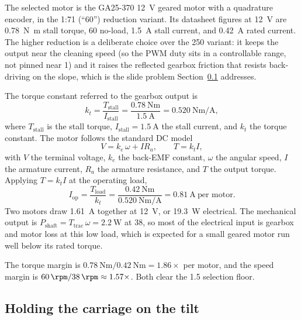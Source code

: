 \documentclass[11pt,a4paper]{article}
\begin{document}
The selected motor is the GA25-370 \SI{12}{\volt} geared motor with a quadrature
encoder, in the \num{1}:\num{71} (``\SI{60}{\rpm}'') reduction variant. Its
datasheet figures at \SI{12}{\volt} are \SI{0.78}{\newton\meter} stall torque,
\SI{60}{\rpm} no-load, \SI{1.5}{\ampere} stall current, and \SI{0.42}{\ampere}
rated current. The higher reduction is a deliberate choice over the
\SI{250}{\rpm} variant: it keeps the output near the cleaning speed (so the PWM
duty sits in a controllable range, not pinned near \num{1}) and it raises the
reflected gearbox friction that resists back-driving on the slope, which is the
slide problem Section~\ref{sec:hold} addresses.

The torque constant referred to the gearbox output is
\begin{equation}
  k_t = \frac{T_{\text{stall}}}{I_{\text{stall}}}
  = \frac{\SI{0.78}{\newton\meter}}{\SI{1.5}{\ampere}}
  = \SI{0.520}{\newton\meter\per\ampere},
  \label{eq:kt}
\end{equation}
where $T_{\text{stall}}$ is the stall torque, $I_{\text{stall}}=\SI{1.5}{\ampere}$
the stall current, and $k_t$ the torque constant. The motor follows the standard
DC model
\begin{equation}
  V = k_e\,\omega + I R_a, \qquad T = k_t I,
  \label{eq:dcmodel}
\end{equation}
with $V$ the terminal voltage, $k_e$ the back-EMF constant, $\omega$ the angular
speed, $I$ the armature current, $R_a$ the armature resistance, and $T$ the
output torque. Applying $T = k_t I$ at the operating load,
\begin{equation}
  I_{\text{op}} = \frac{T_{\text{load}}}{k_t}
  = \frac{\SI{0.42}{\newton\meter}}{\SI{0.520}{\newton\meter\per\ampere}}
  = \SI{0.81}{\ampere}\ \text{per motor.}
  \label{eq:iop_drive}
\end{equation}
Two motors draw \SI{1.61}{\ampere} together at \SI{12}{\volt}, or
\SI{19.3}{\watt} electrical. The mechanical output is
$P_{\text{shaft}} = T_{\text{trac}}\,\omega = \SI{2.2}{\watt}$ at
\SI{38}{\rpm}, so most of the electrical input is gearbox and motor loss at this
low load, which is expected for a small geared motor run well below its rated
torque.

The torque margin is $\SI{0.78}{\newton\meter}/\SI{0.42}{\newton\meter}=
\num{1.86}\times$ per motor, and the speed margin is
$\SI{60}{\rpm}/\SI{38}{\rpm}\approx\num{1.57}\times$. Both clear the
\num{1.5} selection floor.

\subsection{Holding the carriage on the tilt}
\label{sec:hold}
\end{document}
